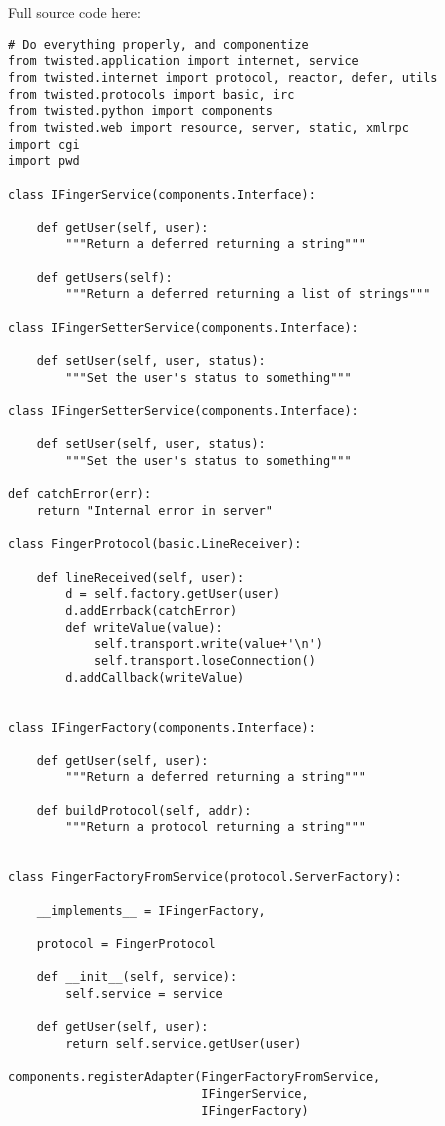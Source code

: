  Full source code here: \begin{verbatim}
# Do everything properly, and componentize
from twisted.application import internet, service
from twisted.internet import protocol, reactor, defer, utils
from twisted.protocols import basic, irc
from twisted.python import components
from twisted.web import resource, server, static, xmlrpc
import cgi
import pwd

class IFingerService(components.Interface):

    def getUser(self, user):
        """Return a deferred returning a string"""

    def getUsers(self):
        """Return a deferred returning a list of strings"""

class IFingerSetterService(components.Interface):

    def setUser(self, user, status):
        """Set the user's status to something"""

class IFingerSetterService(components.Interface):

    def setUser(self, user, status):
        """Set the user's status to something"""

def catchError(err):
    return "Internal error in server"

class FingerProtocol(basic.LineReceiver):

    def lineReceived(self, user):
        d = self.factory.getUser(user)
        d.addErrback(catchError)
        def writeValue(value):
            self.transport.write(value+'\n')
            self.transport.loseConnection()
        d.addCallback(writeValue)


class IFingerFactory(components.Interface):

    def getUser(self, user):
        """Return a deferred returning a string"""

    def buildProtocol(self, addr):
        """Return a protocol returning a string"""


class FingerFactoryFromService(protocol.ServerFactory):

    __implements__ = IFingerFactory,

    protocol = FingerProtocol

    def __init__(self, service):
        self.service = service

    def getUser(self, user):
        return self.service.getUser(user)

components.registerAdapter(FingerFactoryFromService,
                           IFingerService,
                           IFingerFactory)


\end{verbatim}
